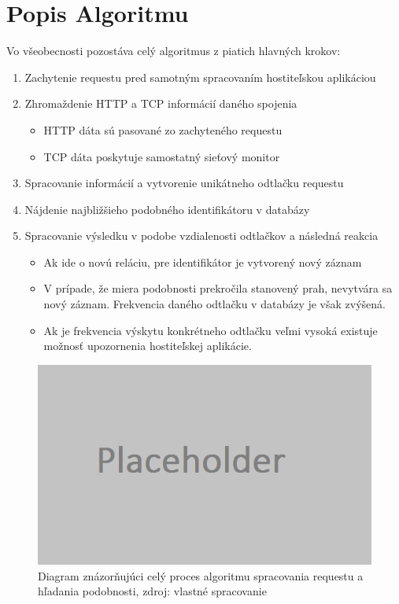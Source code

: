\documentclass[
  printed, %
  table,   %
  lof,     %
  lot,     %
]{fithesis3}
\begin{document}
\section{Popis Algoritmu}
Vo všeobecnosti pozostáva celý algoritmus z piatich hlavných krokov:
\begin{enumerate}
  \item Zachytenie requestu pred samotným spracovaním hostiteľskou aplikáciou
  \item Zhromaždenie HTTP a TCP informácií daného spojenia
  \begin{itemize}
    \item HTTP dáta sú pasované zo zachyteného requestu
    \item TCP dáta poskytuje samostatný sieťový monitor
  \end{itemize}
  \item Spracovanie informácií a vytvorenie unikátneho odtlačku requestu
  \item Nájdenie najbližšieho podobného identifikátoru v databázy
  \item Spracovanie výsledku v podobe vzdialenosti odtlačkov a následná reakcia
  \begin{itemize}
    \item Ak ide o novú reláciu, pre identifikátor je vytvorený nový záznam
    \item V prípade, že miera podobnosti prekročila stanovený prah, nevytvára
    sa nový záznam. Frekvencia daného odtlačku v databázy je však zvýšená.
    \item Ak je frekvencia výskytu konkrétneho odtlačku veľmi vysoká existuje
    možnosť upozornenia hostiteľskej aplikácie.
  \end{itemize}
\end{enumerate}

\begin{figure}[h]
  \centering
    \includegraphics[width=.99\textwidth]{images/footprint-hl.png}
  \caption{Diagram znázorňujúci celý proces algoritmu spracovania requestu a
  hľadania podobnosti, zdroj: vlastné spracovanie}
  \label{fig:footprint-hl}
\end{figure}
\end{document}
